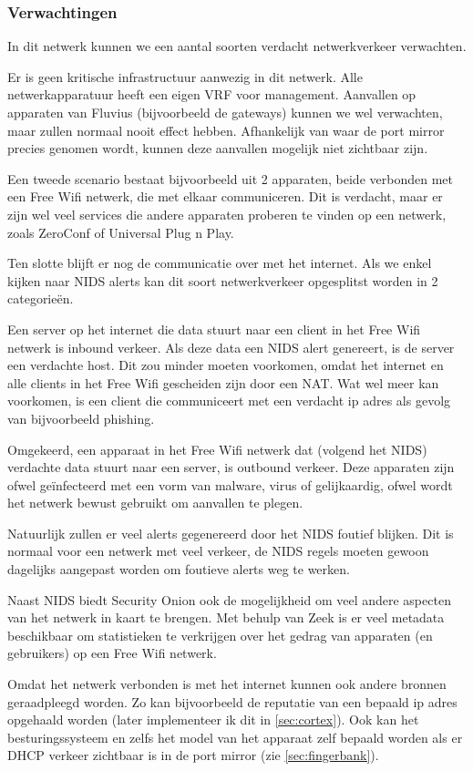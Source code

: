 \documentclass[a4paper,12pt]{report}
\begin{document}
\subsubsection{Verwachtingen}
In dit netwerk kunnen we een aantal soorten verdacht netwerkverkeer verwachten.

Er is geen kritische infrastructuur aanwezig in dit netwerk.
Alle netwerkapparatuur heeft een eigen VRF voor management.
Aanvallen op apparaten van Fluvius (bijvoorbeeld de gateways) kunnen we wel verwachten, maar zullen normaal nooit effect hebben.
Afhankelijk van waar de port mirror precies genomen wordt, kunnen deze aanvallen mogelijk niet zichtbaar zijn.

Een tweede scenario bestaat bijvoorbeeld uit 2 apparaten, beide verbonden met een Free Wifi netwerk, die met elkaar communiceren.
Dit is verdacht, maar er zijn wel veel services die andere apparaten proberen te vinden op een netwerk, zoals ZeroConf of Universal Plug n Play.

Ten slotte blijft er nog de communicatie over met het internet.
Als we enkel kijken naar NIDS alerts kan dit soort netwerkverkeer opgesplitst worden in 2 categorieën.

Een server op het internet die data stuurt naar een client in het Free Wifi netwerk is inbound verkeer.
Als deze data een NIDS alert genereert, is de server een verdachte host.
Dit zou minder moeten voorkomen, omdat het internet en alle clients in het Free Wifi gescheiden zijn door een NAT.
Wat wel meer kan voorkomen, is een client die communiceert met een verdacht ip adres als gevolg van bijvoorbeeld phishing.

Omgekeerd, een apparaat in het Free Wifi netwerk dat (volgend het NIDS) verdachte data stuurt naar een server, is outbound verkeer.
Deze apparaten zijn ofwel geïnfecteerd met een vorm van malware, virus of gelijkaardig, ofwel wordt het netwerk bewust gebruikt om aanvallen te plegen.

Natuurlijk zullen er veel alerts gegenereerd door het NIDS foutief blijken.
Dit is normaal voor een netwerk met veel verkeer, de NIDS regels moeten gewoon dagelijks aangepast worden om foutieve alerts weg te werken.

Naast NIDS biedt Security Onion ook de mogelijkheid om veel andere aspecten van het netwerk in kaart te brengen.
Met behulp van Zeek is er veel metadata beschikbaar om statistieken te verkrijgen over het gedrag van apparaten (en gebruikers) op een Free Wifi netwerk.

Omdat het netwerk verbonden is met het internet kunnen ook andere bronnen geraadpleegd worden.
Zo kan bijvoorbeeld de reputatie van een bepaald ip adres opgehaald worden (later implementeer ik dit in \ref{sec:cortex}).
Ook kan het besturingssysteem en zelfs het model van het apparaat zelf bepaald worden als er DHCP verkeer zichtbaar is in de port mirror (zie \ref{sec:fingerbank}).
\end{document}
